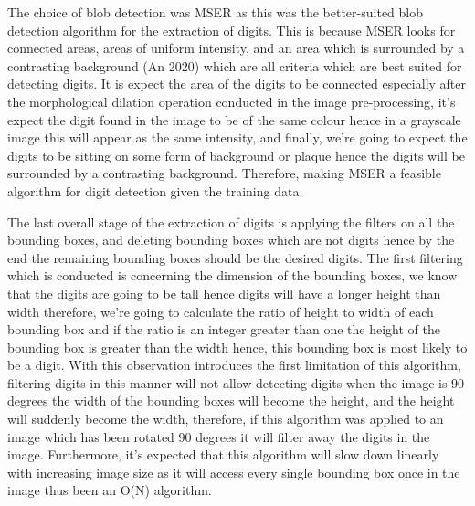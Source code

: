 \documentclass[
	12pt, %
]{fphw}
\begin{document}
The choice of blob detection was MSER as this was the better-suited blob detection algorithm for the extraction of digits. This is because MSER looks for connected areas, areas of uniform intensity, and an area which is surrounded by a contrasting background (An 2020) which are all criteria which are best suited for detecting digits. It is expect the area of the digits to be connected especially after the morphological dilation operation conducted in the image pre-processing, it’s expect the digit found in the image to be of the same colour hence in a grayscale image this will appear as the same intensity, and finally, we’re going to expect the digits to be sitting on some form of background or plaque hence the digits will be surrounded by a contrasting background. Therefore, making MSER a feasible algorithm for digit detection given the training data. \par

The last overall stage of the extraction of digits is applying the filters on all the bounding boxes, and deleting bounding boxes which are not digits hence by the end the remaining bounding boxes should be the desired digits. The first filtering which is conducted is concerning the dimension of the bounding boxes, we know that the digits are going to be tall hence digits will have a longer height than width therefore, we’re going to calculate the ratio of height to width of each bounding box and if the ratio is an integer greater than one the height of the bounding box is greater than the width hence, this bounding box is most likely to be a digit. With this observation introduces the first limitation of this algorithm, filtering digits in this manner will not allow detecting digits when the image is 90 degrees the width of the bounding boxes will become the height, and the height will suddenly become the width, therefore, if this algorithm was applied to an image which has been rotated 90 degrees it will filter away the digits in the image. Furthermore, it’s expected that this algorithm will slow down linearly with increasing image size as it will access every single bounding box once in the image thus been an O(N) algorithm.\par
\end{document}
